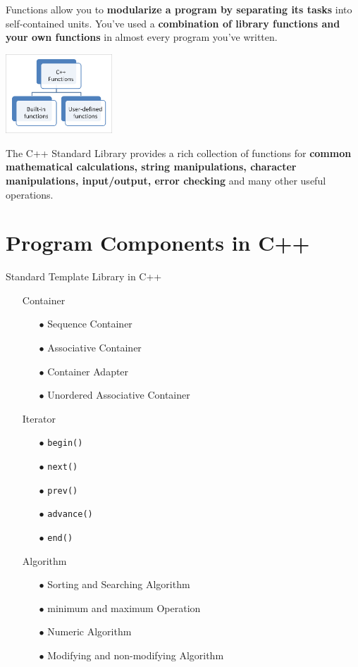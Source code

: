 \documentclass[10pt]{beamer}
\begin{document}
\begin{frame}
	\justifying
	\small
		Functions allow you to \textbf{modularize a program by separating its tasks} into self-contained units. You’ve used a \textbf{combination of library functions and your own functions} in	almost every program you’ve written.
	\begin{center}
		\includegraphics[width=4cm]{./.images/.img-6-2.png}
	\end{center}
\small The C++	Standard Library provides a rich collection of functions for \textbf{common mathematical calculations, string manipulations, character manipulations, input/output, error checking} and many other useful operations.
\end{frame}





\section{Program Components in C++}
\begin{frame}{Standard Template Library in C++}
	\begin{itemize}
		\small
		\item [\color{purple}\blacksquare] Container
		\begin{itemize}
			\item [$\bullet$] Sequence Container
			\item [$\bullet$] Associative Container
			\item [$\bullet$] Container Adapter
			\item [$\bullet$] Unordered Associative Container
		\end{itemize}
	\item [\color{purple}\blacksquare] Iterator
	\begin{itemize}
		\item [$\bullet$] \texttt{begin()}
		\item [$\bullet$] \texttt{next()}
		\item [$\bullet$] \texttt{prev()}
		\item [$\bullet$] \texttt{advance()}
		\item [$\bullet$] \texttt{end()}
	\end{itemize}
	\item [\color{purple}\blacksquare] Algorithm
	\begin{itemize}
		\item [$\bullet$] Sorting and Searching Algorithm
		\item [$\bullet$] minimum and maximum Operation
		\item [$\bullet$] Numeric Algorithm
		\item [$\bullet$] Modifying and non-modifying Algorithm
	\end{itemize}
	\end{itemize}
\end{frame}
	
\end{document}
